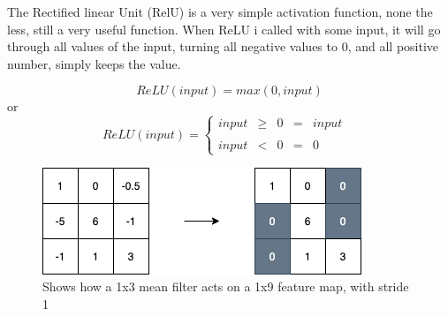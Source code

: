 The Rectified linear Unit (RelU) is a very simple activation function, none the less, still a very useful function. When ReLU i called with some input, it will go through all values of the input, turning all negative values to 0, and all positive number, simply keeps the value.

$$
ReLU(input) = max(0,input)
$$
or
$$
ReLU(input) =
\left\{ \begin{matrix}
		input& \geq& 0& =& input& \\
		\\
		input& <& 0& =& 0&
\end{matrix}
\right.
$$


\begin{figure}[!ht]
  \centering
  \includegraphics[scale=0.4]{latex/IMGs/relu.png}
  \caption{Shows how a 1x3 mean filter acts on a 1x9 feature map, with stride 1}\label{Baseline:before}
\end{figure}